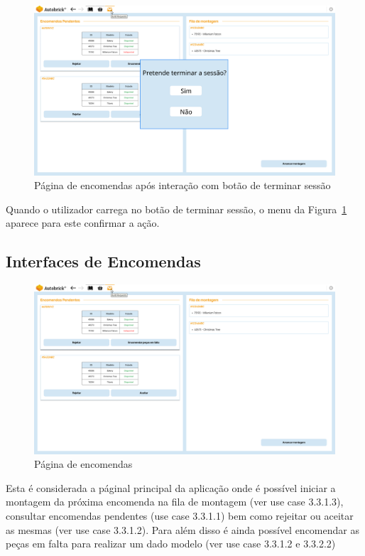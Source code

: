         \clearpage
        \begin{figure}[h!]
            \centering
            \includegraphics[width=0.99\linewidth, frame]{images/Logout.pdf}
            \caption{Página de encomendas após interação com botão de terminar sessão}
            \label{fig:Logout}
        \end{figure}
    
        Quando o utilizador carrega no botão de terminar sessão, o menu da Figura~\ref{fig:Logout} aparece para este confirmar a ação.
    
    \clearpage
    \subsection{Interfaces de Encomendas}

        \begin{figure}[h!]
            \centering
            \includegraphics[width=0.85\linewidth, frame]{images/Requests.pdf}
            \caption{Página de encomendas}
            \label{fig:Encomendas}
        \end{figure}
    
        Esta é considerada a páginal principal da aplicação onde é possível iniciar a montagem da próxima encomenda na fila de montagem (ver use case 3.3.1.3), consultar encomendas pendentes (use case 3.3.1.1) bem como rejeitar ou aceitar as mesmas (ver use case 3.3.1.2). Para além disso é ainda possível encomendar as peças em falta para realizar um dado modelo (ver use case 3.3.1.2 e 3.3.2.2)
    
